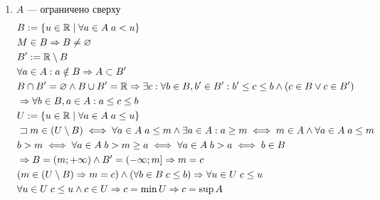 \documentclass{article}
\begin{document}
\proof
\begin{enumerate}
	\item$A$ --- ограничено сверху
	\begin{align*}
		 & B:=\{u\in\mathbb{R}\;|\;\forall a\in A\; a < u\}                               \\
		 & M\in B \Rightarrow B \neq\varnothing                                                 \\
		 & B' := \mathbb{R} \setminus B                                                     \\
		 & \forall a\in A:a\notin B\Rightarrow A\subset B'                                \\
		 & B \cap B'=\varnothing \land B\cup B'=\mathbb{R}
		\Rightarrow \exists c: \forall b\in B, b'\in B':
		b'\leq c\leq b \land (c\in B \lor c\in B')                                  \\
		 & \Rightarrow \forall b\in B, a\in A:
		a\leq c\leq b                                                               \\
		 & U:= \{u\in\mathbb{R}\;|\;\forall a\in A\; a\leq u\}                            \\
		 & \sqsupset m \in (U \setminus B) \iff \forall a\in A\; a\leq m
		\land \exists a\in A:a\geq m \iff m \in A\land \forall a\in A \; a\leq m    \\
		 & b > m \iff \forall a \in A\;b>m\geq a\iff \forall a\in A\;b>a\iff b\in B \\
		 & \Rightarrow B=(m;+\infty) \land B'=(-\infty;m]\Rightarrow m=c                        \\
		 & (m\in (U\setminus B)\Rightarrow m=c)\land(\forall b\in B\; c\leq b)
		\Rightarrow \forall u\in U\; c\leq u                                              \\
		 & \forall u\in U\; c\leq u \land c \in U \Rightarrow c=\min U\Rightarrow c=\sup A      \\
	\end{align*}
\end{enumerate}
\end{document}
